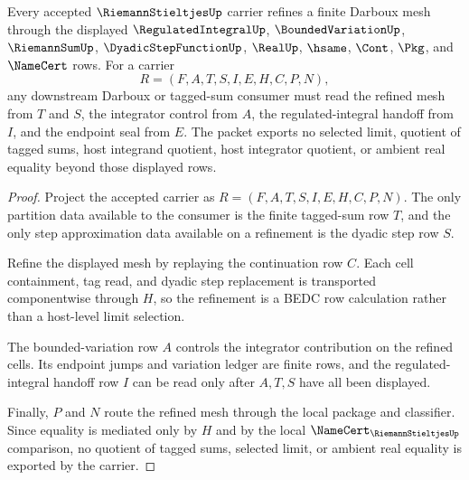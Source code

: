 \begin{theorem}
\label{thm:riemann-stieltjes-darboux-mesh-refinement}
Every accepted $\RiemannStieltjesUp$ carrier refines a finite Darboux mesh through the displayed $\RegulatedIntegralUp$, $\BoundedVariationUp$, $\RiemannSumUp$, $\DyadicStepFunctionUp$, $\RealUp$, $\hsame$, $\Cont$, $\Pkg$, and $\NameCert$ rows. For a carrier
$$
R=(F,A,T,S,I,E,H,C,P,N),
$$
any downstream Darboux or tagged-sum consumer must read the refined mesh from $T$ and $S$, the integrator control from $A$, the regulated-integral handoff from $I$, and the endpoint seal from $E$. The packet exports no selected limit, quotient of tagged sums, host integrand quotient, host integrator quotient, or ambient real equality beyond those displayed rows.
\end{theorem}
\begin{proof}
Project the accepted carrier as $R=(F,A,T,S,I,E,H,C,P,N)$. The only partition data available to the consumer is the finite tagged-sum row $T$, and the only step approximation data available on a refinement is the dyadic step row $S$.

Refine the displayed mesh by replaying the continuation row $C$. Each cell containment, tag read, and dyadic step replacement is transported componentwise through $H$, so the refinement is a BEDC row calculation rather than a host-level limit selection.

The bounded-variation row $A$ controls the integrator contribution on the refined cells. Its endpoint jumps and variation ledger are finite rows, and the regulated-integral handoff row $I$ can be read only after $A,T,S$ have all been displayed.

Finally, $P$ and $N$ route the refined mesh through the local package and classifier. Since equality is mediated only by $H$ and by the local $\NameCert_{\RiemannStieltjesUp}$ comparison, no quotient of tagged sums, selected limit, or ambient real equality is exported by the carrier.
\end{proof}

